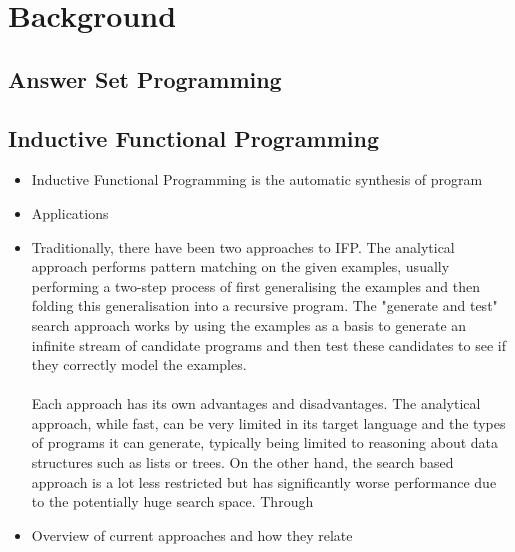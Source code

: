 \chapter{Background}

\section{Answer Set Programming}

\section{Inductive Functional Programming}

\begin{itemize}
\item Inductive Functional Programming is the automatic synthesis of program
\item Applications
\item Traditionally, there have been two approaches to IFP. The analytical approach performs pattern matching on the given examples, usually performing a two-step process of first generalising the examples and then folding this generalisation into a recursive program. The "generate and test" search approach works by using the examples as a basis to generate an infinite stream of candidate programs and then test these candidates to see if they correctly model the examples. \\ \\
Each approach has its own advantages and disadvantages. The analytical approach, while fast, can be very limited in its target language and the types of programs it can generate, typically being limited to reasoning about data structures such as lists or trees. On the other hand, the search based approach is a lot less restricted but has significantly worse performance due to the potentially huge search space. Through 
\item Overview of current approaches and how they relate
\end{itemize}

\pagebreak
\renewcommand\bibname{{References}}

